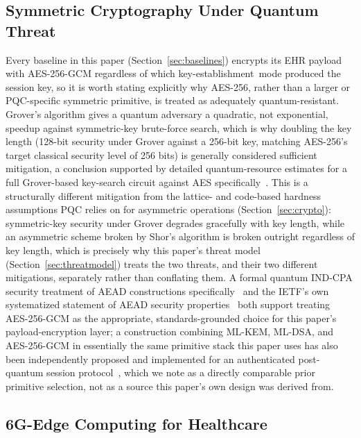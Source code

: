 \documentclass[journal]{IEEEtran}
\newcommand{\keyest}{key-establishment}
\begin{document}
\subsection{Symmetric Cryptography Under Quantum Threat}

Every baseline in this paper (Section~\ref{sec:baselines}) encrypts its EHR payload with AES-256-GCM regardless of which \keyest\ mode produced the session key, so it is worth stating explicitly why AES-256, rather than a larger or PQC-specific symmetric primitive, is treated as adequately quantum-resistant. Grover's algorithm gives a quantum adversary a quadratic, not exponential, speedup against symmetric-key brute-force search, which is why doubling the key length (128-bit security under Grover against a 256-bit key, matching AES-256's target classical security level of 256 bits) is generally considered sufficient mitigation, a conclusion supported by detailed quantum-resource estimates for a full Grover-based key-search circuit against AES specifically~\cite{grassl2016groveraes,groveroraclesaes2020}. This is a structurally different mitigation from the lattice- and code-based hardness assumptions PQC relies on for asymmetric operations (Section~\ref{sec:crypto}): symmetric-key security under Grover degrades gracefully with key length, while an asymmetric scheme broken by Shor's algorithm is broken outright regardless of key length, which is precisely why this paper's threat model (Section~\ref{sec:threatmodel}) treats the two threats, and their two different mitigations, separately rather than conflating them. A formal quantum IND-CPA security treatment of AEAD constructions specifically~\cite{quantumindcpaaead2025} and the IETF's own systematized statement of AEAD security properties~\cite{ietf2025rfc9771} both support treating AES-256-GCM as the appropriate, standards-grounded choice for this paper's payload-encryption layer; a construction combining ML-KEM, ML-DSA, and AES-256-GCM in essentially the same primitive stack this paper uses has also been independently proposed and implemented for an authenticated post-quantum session protocol~\cite{mlkemmldsaaes2025}, which we note as a directly comparable prior primitive selection, not as a source this paper's own design was derived from.

\subsection{6G-Edge Computing for Healthcare}
\end{document}
